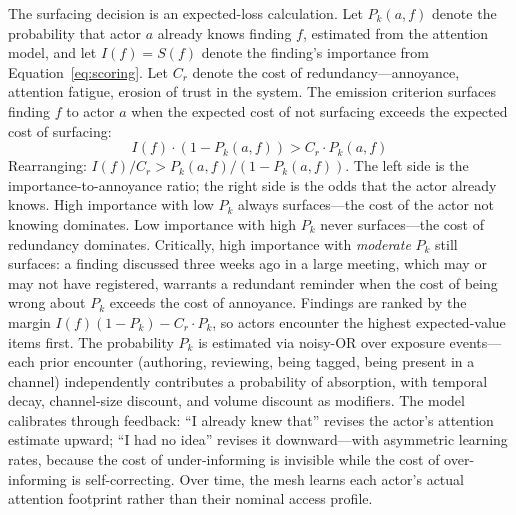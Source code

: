 \documentclass[11pt,a4paper]{article}
\begin{document}
The surfacing decision is an expected-loss calculation. Let $P_k(a, f)$ denote the probability that actor $a$ already knows finding $f$, estimated from the attention model, and let $I(f) = S(f)$ denote the finding's importance from Equation~\ref{eq:scoring}. Let $C_r$ denote the cost of redundancy---annoyance, attention fatigue, erosion of trust in the system. The emission criterion surfaces finding $f$ to actor $a$ when the expected cost of not surfacing exceeds the expected cost of surfacing:
\begin{equation}
I(f) \cdot (1 - P_k(a, f)) > C_r \cdot P_k(a, f)
\label{eq:emission}
\end{equation}
Rearranging: $I(f) / C_r > P_k(a, f) / (1 - P_k(a, f))$. The left side is the importance-to-annoyance ratio; the right side is the odds that the actor already knows. High importance with low $P_k$ always surfaces---the cost of the actor not knowing dominates. Low importance with high $P_k$ never surfaces---the cost of redundancy dominates. Critically, high importance with \emph{moderate} $P_k$ still surfaces: a finding discussed three weeks ago in a large meeting, which may or may not have registered, warrants a redundant reminder when the cost of being wrong about $P_k$ exceeds the cost of annoyance. Findings are ranked by the margin $I(f)(1 - P_k) - C_r \cdot P_k$, so actors encounter the highest expected-value items first. The probability $P_k$ is estimated via noisy-OR over exposure events---each prior encounter (authoring, reviewing, being tagged, being present in a channel) independently contributes a probability of absorption, with temporal decay, channel-size discount, and volume discount as modifiers. The model calibrates through feedback: ``I already knew that'' revises the actor's attention estimate upward; ``I had no idea'' revises it downward---with asymmetric learning rates, because the cost of under-informing is invisible while the cost of over-informing is self-correcting. Over time, the mesh learns each actor's actual attention footprint rather than their nominal access profile.
\end{document}
